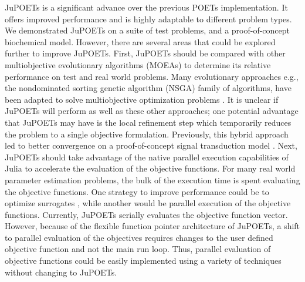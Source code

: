 \documentclass{bmcart}
\begin{document}
JuPOETs is a significant advance over the previous POETs implementation.
It offers improved performance and is highly adaptable to different problem types.
We demonstrated JuPOETs on a suite of test problems, and a proof-of-concept biochemical model.
However, there are several areas that could be explored further to improve JuPOETs.
First, JuPOETs should be compared with other multiobjective evolutionary algorithms (MOEAs) to determine its relative performance on test and real world problems.
Many evolutionary approaches e.g., the nondominated sorting genetic algorithm (NSGA) family of algorithms, have been adapted to solve multiobjective optimization problems \cite{DEB2002,HUBAND2006}. It is unclear if JuPOETs will perform as well as these other approaches;
one potential advantage that JuPOETs may have is the local refinement step which temporarily reduces the problem to a single objective formulation.
Previously, this hybrid approach led to better convergence on a proof-of-concept signal transduction model \cite{Song:2010aa}.
Next, JuPOETs should take advantage of the native parallel execution capabilities of Julia to accelerate the evaluation of the objective functions.
For many real world parameter estimation problems, the bulk of the execution time is spent evaluating the objective functions.
One strategy to improve performance could be to optimize surrogates \cite{SURROGATES}, while another would be parallel execution of the objective functions.
Currently, JuPOETs serially evaluates the objective function vector.
However, because of the flexible function pointer architecture of JuPOETs, a shift to parallel evaluation of the objectives requires changes to the user
defined objective function and not the main run loop. Thus, parallel evaluation of objective functions could be easily implemented
using a variety of techniques without changing to JuPOETs.

\end{document}
